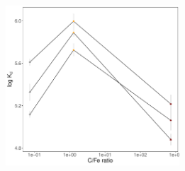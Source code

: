 \begin{figure}[t!]
\begin{subfigure}[t]{0.5\textwidth}
    \end{subfigure}%
    ~ 
    \begin{subfigure}[t]{0.5\textwidth}
        \centering
        \includegraphics[height=6cm]{R/figs/Kd_1ugL_C_Fe.pdf}
        \caption{}
        \label{subfig:C_Fe}
    \end{subfigure}
    \label{fig:C_Ca_Fe}
    \caption{}
\end{figure}

